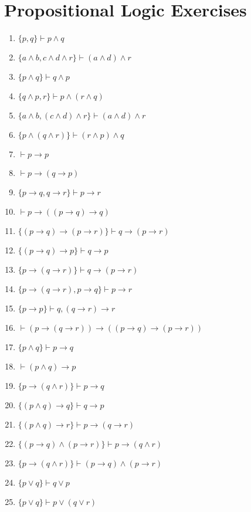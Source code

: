 \section{Propositional Logic Exercises}
\begin{enumerate}
    \item \(\{\textit{p}, \textit{q}\} \vdash p \land q\)
    \item \(\{\textit{a} \land \textit{b}, \textit{c} \land \textit{d} \land \textit{r}\} \vdash (a \land d) \land r\)
    \item \(\{p \land q\} \vdash q \land p\)
    \item \(\{q \land p, r\} \vdash p \land (r \land q)\)
    \item \(\{a \land b, (c \land d) \land r\} \vdash (a \land d) \land r\)
    \item \(\{p \land (q \land r)\} \vdash (r \land p) \land q\)
    \item \(\vdash p \to p\)
    \item \(\vdash p \to (q \to p)\)
    \item \(\{p \to q, q \to r\} \vdash p \to r\)
    \item \(\vdash p \to ((p \to q) \to q)\)
    \item \(\{(p \to q) \to (p \to r)\} \vdash q \to (p \to r)\)
    \item \(\{(p \to q) \to p\} \vdash q \to p\)
    \item \(\{p \to (q \to r)\} \vdash q \to (p \to r)\)
    \item \(\{p \to (q \to r), p \to q\} \vdash p \to r\)
    \item \(\{p \to p\} \vdash q, (q \to r) \to r\)
    \item \(\vdash (p \to (q \to r)) \to ((p \to q) \to (p \to r))\)
    \item \(\{p \land q\} \vdash p \to q\)
    \item \(\vdash (p \land q) \to p\)
    \item \(\{p \to (q \land r)\} \vdash p \to q\)
    \item \(\{(p \land q) \to q\} \vdash q \to p\)
    \item \(\{(p \land q) \to r\} \vdash p \to (q \to r)\)
    \item \(\{(p \to q) \land (p \to r)\} \vdash p \to (q \land r)\)
    \item \(\{p \to (q \land r)\} \vdash (p \to q) \land (p \to r)\)
    \item \(\{p \lor q\} \vdash q \lor p\)
    \item \(\{p \lor q\} \vdash p \lor (q \lor r)\)

\end{enumerate}

